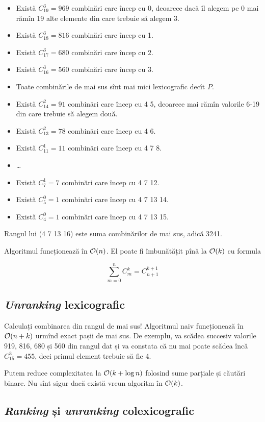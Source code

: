 \documentclass[../main.tex]{subfiles}
\begin{document}
\begin{itemize}
  \item Există $C_{19}^{3} = 969$ combinări care încep cu 0, deoarece dacă îl alegem pe 0 mai rămîn 19 alte elemente din care trebuie să alegem 3.
  \item Există $C_{18}^{3} = 816$ combinări care încep cu 1.
  \item Există $C_{17}^{3} = 680$ combinări care încep cu 2.
  \item Există $C_{16}^{3} = 560$ combinări care încep cu 3.
  \item Toate combinările de mai sus sînt mai mici lexicografic decît $P$.
  \item Există $C_{14}^{2} = 91$ combinări care încep cu 4 5, deoarece mai rămîn valorile 6-19 din care trebuie să alegem două.
  \item Există $C_{13}^{2} = 78$ combinări care încep cu 4 6.
  \item Există $C_{11}^1 = 11$ combinări care încep cu 4 7 8.
  \item \dots
  \item Există $C_{7}^1 = 7$ combinări care încep cu 4 7 12.
  \item Există $C_{5}^0 = 1$ combinări care încep cu 4 7 13 14.
  \item Există $C_{4}^0 = 1$ combinări care încep cu 4 7 13 15.
\end{itemize}

Rangul lui (4 7 13 16) este suma combinărilor de mai sus, adică 3241.

Algoritmul funcționează în $\mathcal{O}(n)$. El poate fi îmbunătățit pînă la $\mathcal{O}(k)$ cu formula

$$\sum_{m = 0}^{n} C_m^k = C_{n+1}^{k+1}$$

\subsection{\textit{Unranking} lexicografic}

Calculați combinarea din rangul de mai sus! Algoritmul naiv funcționează în $\mathcal{O}(n + k)$ urmînd exact pașii de mai sus. De exemplu, va scădea succesiv valorile 919, 816, 680 și 560 din rangul dat și va constata că nu mai poate scădea încă $C_{15}^3 = 455$, deci primul element trebuie să fie 4.

Putem reduce complexitatea la $\mathcal{O}(k + \log n)$ folosind sume parțiale și căutări binare. Nu sînt sigur dacă există vreun algoritm în $\mathcal{O}(k)$.

\subsection{\textit{Ranking} și \textit{unranking} colexicografic}
\end{document}
